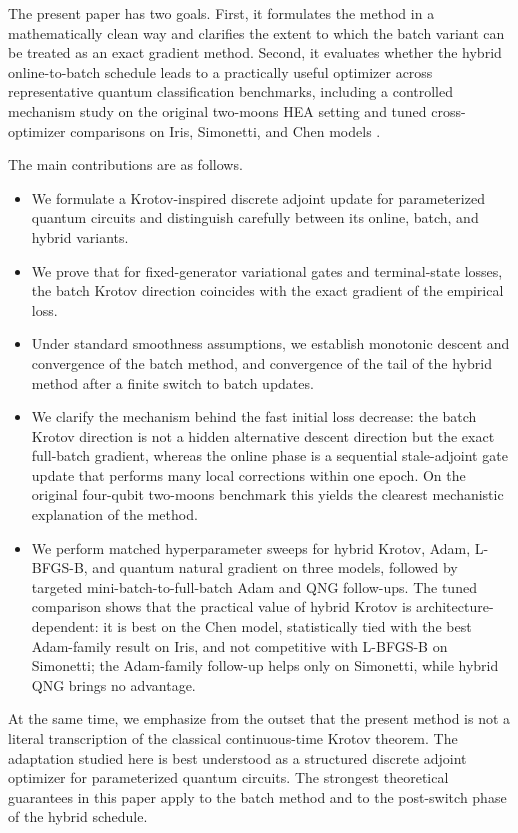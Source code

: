\documentclass[aps,prb,10pt,twocolumn,superscriptaddress]{revtex4-2}
\begin{document}
The present paper has two goals. First, it formulates the method in a mathematically clean way and clarifies the extent to which the batch variant can be treated as an exact gradient method. Second, it evaluates whether the hybrid online-to-batch schedule leads to a practically useful optimizer across representative quantum classification benchmarks, including a controlled mechanism study on the original two-moons HEA setting and tuned cross-optimizer comparisons on Iris, Simonetti, and Chen models \cite{SimonettiPerriGervasi2022,SimonettiPerriGervasi2023, ChenEtAl2025SUNVQC}.

The main contributions are as follows.
\begin{itemize}
    \item We formulate a Krotov-inspired discrete adjoint update for parameterized quantum circuits and distinguish carefully between its online, batch, and hybrid variants.
    \item We prove that for fixed-generator variational gates and terminal-state losses, the batch Krotov direction coincides with the exact gradient of the empirical loss.
    \item Under standard smoothness assumptions, we establish monotonic descent and convergence of the batch method, and convergence of the tail of the hybrid method after a finite switch to batch updates.
    \item We clarify the mechanism behind the fast initial loss decrease: the batch Krotov direction is not a hidden alternative descent direction but the exact full-batch gradient, whereas the online phase is a sequential stale-adjoint gate update that performs many local corrections within one epoch. On the original four-qubit two-moons benchmark this yields the clearest mechanistic explanation of the method.
    \item We perform matched hyperparameter sweeps for hybrid Krotov, Adam, L-BFGS-B, and quantum natural gradient on three models, followed by targeted mini-batch-to-full-batch Adam and QNG follow-ups. The tuned comparison shows that the practical value of hybrid Krotov is architecture-dependent: it is best on the Chen model, statistically tied with the best Adam-family result on Iris, and not competitive with L-BFGS-B on Simonetti; the Adam-family follow-up helps only on Simonetti, while hybrid QNG brings no advantage.
\end{itemize}

At the same time, we emphasize from the outset that the present method is not a literal transcription of the classical continuous-time Krotov theorem. The adaptation studied here is best understood as a structured discrete adjoint optimizer for parameterized quantum circuits. The strongest theoretical guarantees in this paper apply to the batch method and to the post-switch phase of the hybrid schedule.
\end{document}
